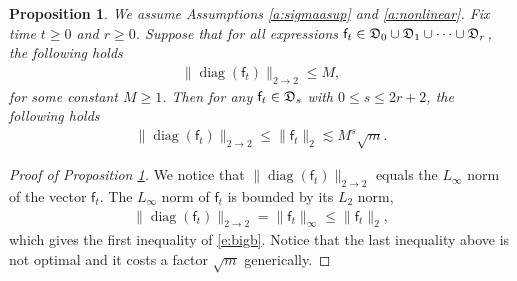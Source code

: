 \documentclass{article}
\numberwithin{equation}{section}
\newcommand{\fD}{{\frak D}}
\newcommand{\sff}{{\mathsf f}}
\DeclareMathOperator{\diag}{diag}
\renewcommand{\leq}{\leqslant}
\renewcommand{\geq}{\geqslant}
\newcommand{\cor}{\color{darkred}}
\newcommand{\nc}{\normalcolor}
\newcommand{\1}{\mathds{1}}
\theoremstyle{plain} %
\newtheorem{proposition}[theorem]{Proposition}
\begin{document}
\begin{proposition}\label{p:upperb}
We assume Assumptions \ref{a:sigmaasup} and \ref{a:nonlinear}.
Fix time $t\geq 0$ and $r\geq 0$. Suppose that  for all expressions $\sff_t\in \fD_0\cup\fD_1\cup
\cdots\cup \fD_r$, the following holds
\begin{align}\label{e:smallb}
\|\diag(\sff_t)\|_{2\rightarrow 2}\leq M, 
\end{align}
for some constant $M \ge 1$. \nc 
Then for any $\sff_t\in \fD_s$ with $0\leq s\leq 2r+2$, the following holds
\begin{align}\label{e:bigb}
\|\diag(\sff_t)\|_{2\rightarrow 2}\leq \|\sff_t\|_{2}  \lesssim M^{s}\sqrt m.
\end{align}
\end{proposition}
\begin{proof}[Proof of Proposition \ref{p:upperb}]
%

We notice that $\|\diag(\sff_t)\|_{2\rightarrow 2}$ equals the $L_\infty$ norm of the vector $\sff_t$. The $L_\infty$ norm of $\sff_t$ is bounded by its $L_2$ norm, 
\begin{align*}
\|\diag(\sff_t)\|_{2\rightarrow 2}=\|\sff_t\|_\infty\leq \|\sff_t\|_2,
\end{align*}
which gives the first inequality of \eqref{e:bigb}. Notice that the last  inequality above 
is not optimal and it costs a factor $\sqrt m$  generically. 


\end{proof}
\end{document}
